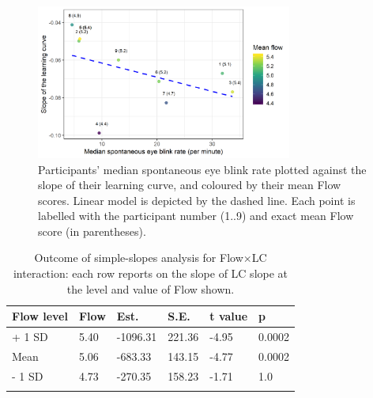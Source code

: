 \documentclass[10pt,letterpaper,floatsintext]{article}
\newcommand{\nicewidth}{0.75\textwidth}
\begin{document}
\begin{figure}[!ht]
	\centering
	\includegraphics[width=\nicewidth]{lcurve_sbr_flowRL2}
	\caption{Participants' median spontaneous eye blink rate plotted against the slope of their learning curve, and coloured by their mean Flow scores. Linear model is depicted by the dashed line. Each point is labelled with the participant number (1..9) and exact mean Flow score (in parentheses).}
	\label{fig:EBRvLC}
\end{figure}



\begin{table}[!hb]
\centering
\caption{Outcome of simple-slopes analysis for Flow$\times$LC interaction: each row reports on the slope of LC slope at the level and value of Flow shown.}
\begin{tabular}{llllll}
\hline
Flow level & Flow & Est. & S.E. & t value & p \\
\hline
+ 1 SD & 5.40 & -1096.31 & 221.36 & -4.95 & 0.0002 \\
Mean   & 5.06 &  -683.33 & 143.15 & -4.77 & 0.0002 \\
- 1 SD & 4.73 &  -270.35 & 158.23 & -1.71 & 1.0 \\
\hline
\label{tab:simpslopes}
\end{tabular}
\end{table}

%
\end{document}
